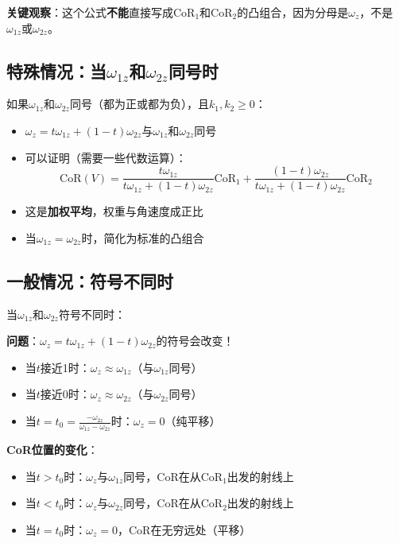 \documentclass[12pt,a4paper]{article}
\begin{document}
\textbf{关键观察}：这个公式\textbf{不能}直接写成$\text{CoR}_1$和$\text{CoR}_2$的凸组合，因为分母是$\omega_z$，不是$\omega_{1z}$或$\omega_{2z}$。

\subsection{特殊情况：当$\omega_{1z}$和$\omega_{2z}$同号时}

如果$\omega_{1z}$和$\omega_{2z}$同号（都为正或都为负），且$k_1, k_2 \geq 0$：

\begin{itemize}
\item $\omega_z = t \omega_{1z} + (1-t) \omega_{2z}$与$\omega_{1z}$和$\omega_{2z}$同号
\item 可以证明（需要一些代数运算）：
  \begin{equation}
  \text{CoR}(V) = \frac{t \omega_{1z}}{t \omega_{1z} + (1-t) \omega_{2z}} \text{CoR}_1 + \frac{(1-t) \omega_{2z}}{t \omega_{1z} + (1-t) \omega_{2z}} \text{CoR}_2
  \end{equation}
\item 这是\textbf{加权平均}，权重与角速度成正比
\item 当$\omega_{1z} = \omega_{2z}$时，简化为标准的凸组合
\end{itemize}

\subsection{一般情况：符号不同时}

当$\omega_{1z}$和$\omega_{2z}$符号不同时：

\textbf{问题}：$\omega_z = t \omega_{1z} + (1-t) \omega_{2z}$的符号会改变！

\begin{itemize}
\item 当$t$接近1时：$\omega_z \approx \omega_{1z}$（与$\omega_{1z}$同号）
\item 当$t$接近0时：$\omega_z \approx \omega_{2z}$（与$\omega_{2z}$同号）
\item 当$t = t_0 = \frac{-\omega_{2z}}{\omega_{1z} - \omega_{2z}}$时：$\omega_z = 0$（纯平移）
\end{itemize}

\textbf{CoR位置的变化}：

\begin{itemize}
\item 当$t > t_0$时：$\omega_z$与$\omega_{1z}$同号，CoR在从CoR$_1$出发的射线上
\item 当$t < t_0$时：$\omega_z$与$\omega_{2z}$同号，CoR在从CoR$_2$出发的射线上
\item 当$t = t_0$时：$\omega_z = 0$，CoR在无穷远处（平移）
\end{itemize}
\end{document}
